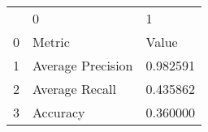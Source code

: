 \begin{tabular}{lll}
 & 0 & 1 \\
0 & Metric & Value \\
1 & Average Precision & 0.982591 \\
2 & Average Recall & 0.435862 \\
3 & Accuracy & 0.360000 \\
\end{tabular}

